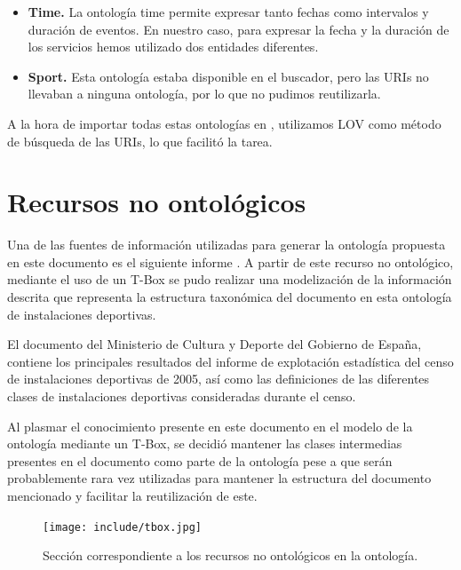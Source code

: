 \documentclass[a4paper,12pt]{article}
\begin{document}
	\begin{itemize}
		\item \textbf{Time.} La ontología time permite expresar tanto fechas como intervalos y duración de eventos. En nuestro caso, para expresar la fecha y la duración de los servicios hemos utilizado dos entidades diferentes.
		\item \textbf{Sport.} Esta ontología estaba disponible en el buscador, pero las URIs no llevaban a ninguna ontología, por lo que no pudimos reutilizarla. 
	\end{itemize}
	A la hora de importar todas estas ontologías en , utilizamos LOV como método de búsqueda de las URIs, lo que facilitó la tarea. 
	
	\section{Recursos no ontológicos}
	
	Una de las fuentes de información utilizadas para generar la ontología propuesta en este documento es el siguiente informe \cite{pdf-culturaydeporte}. A partir de este recurso no ontológico, mediante el uso de un T-Box se pudo realizar una modelización de la información descrita que representa la estructura taxonómica del documento en esta ontología de instalaciones deportivas. 
	
	El documento \cite{pdf-culturaydeporte} del Ministerio de Cultura y Deporte del Gobierno de España, contiene los  principales resultados del informe de explotación estadística del censo de instalaciones deportivas de 2005, así como las definiciones de las diferentes clases de instalaciones deportivas consideradas durante el censo.
	
	Al plasmar el conocimiento presente en este documento en el modelo de la ontología mediante un T-Box, se decidió mantener las clases intermedias presentes en el documento como parte de la ontología pese a que serán probablemente rara vez utilizadas para mantener la estructura del documento mencionado y facilitar la reutilización de este. 
	
	\begin{figure}[H]
		\centering
		\texttt{[image: include/tbox.jpg]}
		\caption{Sección correspondiente a los recursos no ontológicos en la ontología.}
	\end{figure}
	
\end{document}
